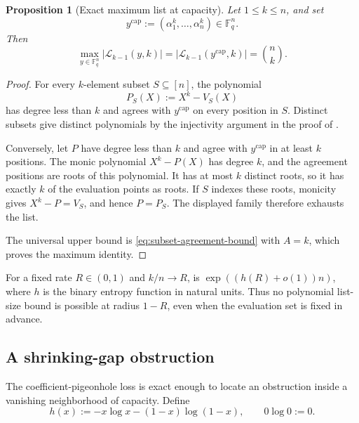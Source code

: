 \documentclass[11pt,letterpaper]{article}
\newtheorem{proposition}[proposition]{Proposition}
\theoremstyle{definition}
\newcommand{\F}{\mathbb{F}}
\newcommand{\List}{\mathcal{L}}
\begin{document}
\begin{proposition}[Exact maximum list at capacity]
\label{prop:exact-capacity-list}
Let \(1\leq k\leq n\), and set
\begin{equation}
  y^{\mathrm{cap}}
  :=(\alpha_1^k,\ldots,\alpha_n^k)\in\F_q^n.
  \label{eq:capacity-center}
\end{equation}
Then
\begin{equation}
  \max_{y\in\F_q^n}
  \bigl|\List_{k-1}(y,k)\bigr|
  =
  \bigl|\List_{k-1}(y^{\mathrm{cap}},k)\bigr|
  =\binom{n}{k}.
  \label{eq:exact-capacity-list-size}
\end{equation}
\end{proposition}

\begin{proof}
For every \(k\)-element subset \(S\subseteq[n]\), the polynomial
\begin{equation}
  P_S(X):=X^k-V_S(X)
  \label{eq:capacity-message}
\end{equation}
has degree less than \(k\) and agrees with \(y^{\mathrm{cap}}\) on every
position in \(S\).  Distinct subsets give distinct polynomials by the
injectivity argument in the proof of .

Conversely, let \(P\) have degree less than \(k\) and agree with
\(y^{\mathrm{cap}}\) in at least \(k\) positions.  The monic polynomial
\(X^k-P(X)\) has degree \(k\), and the agreement positions are roots of this
polynomial.  It has at most \(k\) distinct roots, so it has exactly \(k\) of
the evaluation points as roots.  If \(S\) indexes these roots, monicity gives
\(X^k-P=V_S\), and hence \(P=P_S\).  The displayed family therefore exhausts
the list.

The universal upper bound is \eqref{eq:subset-agreement-bound} with \(A=k\),
which proves the maximum identity.
\end{proof}

For a fixed rate \(R\in(0,1)\) and \(k/n\to R\),
 is
\(\exp((h(R)+o(1))n)\), where \(h\) is the binary entropy function in natural
units.  Thus no polynomial list-size bound is possible at radius \(1-R\),
even when the evaluation set is fixed in advance.

\subsection{A shrinking-gap obstruction}

The coefficient-pigeonhole loss is exact enough to locate an obstruction
inside a vanishing neighborhood of capacity.  Define
\begin{equation}
  h(x):=-x\log x-(1-x)\log(1-x),
  \qquad 0\log 0:=0.
  \label{eq:binary-entropy}
\end{equation}
\end{document}
